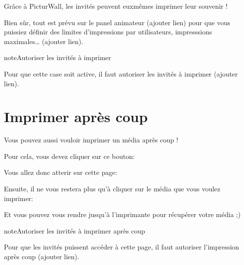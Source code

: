 \documentclass[letterpaper,10pt,french]{sphinxmanual}
\begin{document}
\sphinxAtStartPar
Grâce à PicturWall, les invités peuvent eux\sphinxhyphen{}mêmes imprimer leur souvenir !

\sphinxAtStartPar
Bien sûr, tout est prévu sur le panel animateur (ajouter lien) pour que vous puissiez définir des limites d’impressions par utilisateurs, impresssions maximales… (ajouter lien).

\begin{sphinxadmonition}{note}{Autoriser les invités à imprimer}

\sphinxAtStartPar
Pour que cette case soit active, il faut autoriser les invités à imprimer (ajouter lien).
\end{sphinxadmonition}


\chapter{Imprimer après coup}
\label{\detokenize{panel_invite/index:imprimer-apres-coup}}\label{\detokenize{panel_invite/index:invite-impression-apres-coup}}
\sphinxAtStartPar
Vous pouvez aussi vouloir imprimer un média après coup !

\sphinxAtStartPar
Pour cela, vous devez cliquer sur ce bouton: 

\sphinxAtStartPar
Vous allez donc atterir sur cette page:

\begin{figure}[htbp]
\centering

\noindent{}
\end{figure}

\sphinxAtStartPar
Ensuite, il ne vous restera plus qu’à cliquer sur le média que vous voulez imprimer:

\begin{figure}[htbp]
\centering

\noindent{}
\end{figure}

\sphinxAtStartPar
Et vous pouvez vous rendre jusqu’à l’imprimante pour récupérer votre média ;)

\begin{sphinxadmonition}{note}{Autoriser les invités à imprimer après coup}

\sphinxAtStartPar
Pour que les invités puissent accéder à cette page, il faut autoriser l’impression après coup (ajouter lien).
\end{sphinxadmonition}
\end{document}
